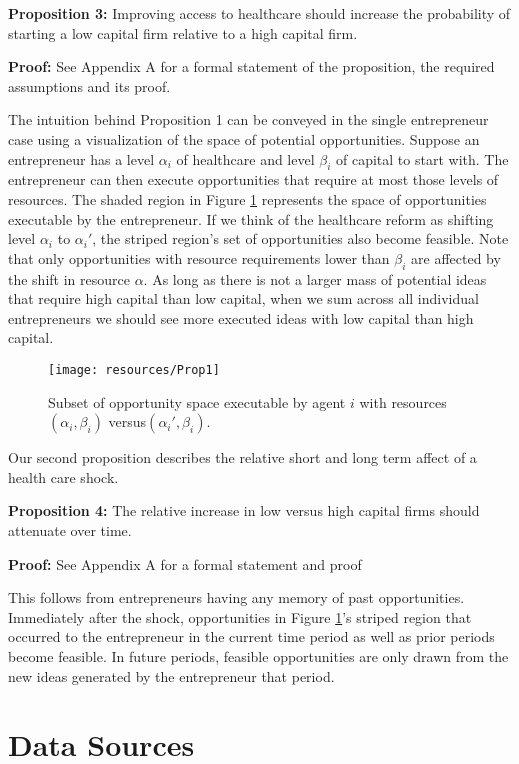 \documentclass[12pt]{article}
\begin{document}
\textbf{Proposition 3:} 
Improving access to healthcare should increase the probability of starting a low capital firm relative to a high capital firm. 

\textbf{Proof:}
See Appendix A for a formal statement of the proposition, the required assumptions and its proof. 

The intuition behind Proposition 1 can be conveyed in the single entrepreneur case using a visualization of the space of potential opportunities. Suppose an entrepreneur has a level $\alpha_i$ of healthcare and level $\beta_i$ of capital to start with. The entrepreneur can then execute opportunities that require at most those levels of resources. The shaded region in Figure \ref{fig:ideaSpace} represents the space of opportunities executable by the entrepreneur. If we think of the healthcare reform as shifting level $\alpha_i$ to $\alpha_i'$, the striped region's set of opportunities also become feasible. Note that only opportunities with resource requirements lower than $\beta_i$ are affected by the shift in resource $\alpha$. As long as there is not a larger mass of potential ideas that require high capital than low capital, when we sum across all individual entrepreneurs we should see more executed ideas with low capital than high capital. 

\begin{figure}[H]
	\centering
	\texttt{[image: resources/Prop1]}
	\caption{Subset of opportunity space executable by agent $i$ with resources $(\alpha_i,\beta_i)$ versus$(\alpha_i', \beta_i)$.}
	\label{fig:ideaSpace}
\end{figure}

Our second proposition describes the relative short and long term affect of a health care shock. 

\textbf{Proposition 4:} The relative increase in low versus high capital firms should attenuate over time. 

\textbf{Proof:} See Appendix A for a formal statement and proof

This follows from entrepreneurs having any memory of past opportunities. Immediately after the shock, opportunities in Figure \ref{fig:ideaSpace}'s striped region that occurred to the entrepreneur in the current time period as well as prior periods become feasible. In future periods, feasible opportunities are only drawn from the new ideas generated by the entrepreneur that period.


\section{Data Sources}
\label{sec:data}
\end{document}
